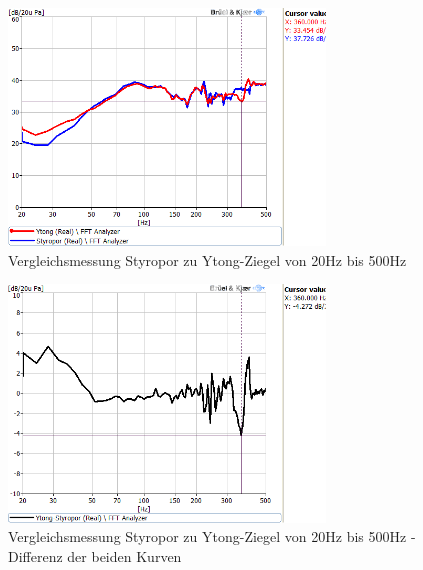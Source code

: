 \begin{figure} [H]
	\centering
	\includegraphics[width=0.75\textwidth]{img/Optimierung/Vergleich/VergleichYtognStyro_500Hz.png}
	\caption{Vergleichsmessung Styropor zu Ytong-Ziegel von 20Hz bis 500Hz}
	\label{fig:4.4.1.3}
\end{figure}
\begin{figure} [H]
	\centering
	\includegraphics[width=0.75\textwidth]{img/Optimierung/Vergleich/VergleichYtognStyro_Abweichung_500Hz.png}
	\caption{Vergleichsmessung Styropor zu Ytong-Ziegel von 20Hz bis 500Hz - Differenz der beiden Kurven}
	\label{fig:4.4.1.4}
\end{figure}


